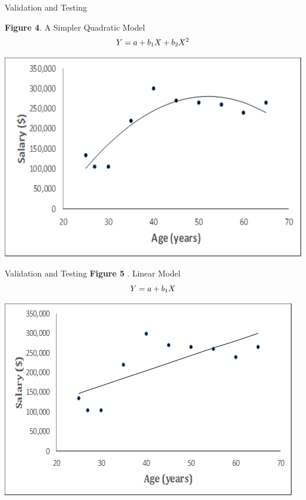 \documentclass[11pt]{beamer}
\begin{document}
%
%
\begin{frame}{Validation and Testing}

\textbf{Figure 4}. A Simpler Quadratic Model
	\begin{equation}
	Y = a + b_1X + b_2X^2 \notag
	\end{equation}		
	 
	\begin{center}
	\includegraphics[scale=.6]{../05-pictures/lesson-2-1_pic_6.png}
	\end{center}
\end{frame}
%
%
\begin{frame}{Validation and Testing}
\textbf{Figure 5 }. Linear Model
	\begin{equation}
		Y = a + b_1X \notag
	\end{equation}
	\begin{center}
	\includegraphics[scale=.6]{../05-pictures/lesson-2-1_pic_7.png}
	\end{center}
\end{frame}
\end{document}
